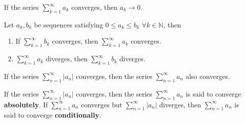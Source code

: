 \documentclass{report}
\begin{document}
\begin{theorem}
If the series  $\sum_{k=1}^{\infty}a_k$ converges, then $a_k \rightarrow 0$.
\end{theorem}

\begin{theorem}
Let $a_k,b_k$ be sequences satisfying $0 \leq a_k \leq b_k$ $\forall k \in \mathbb{N}$, then 
\begin{enumerate}
\item If  $\sum_{k=1}^{\infty}b_k$ converges, then  $\sum_{k=1}^{\infty}a_k$ converges.
\item  $\sum_{k=1}^{\infty}a_k$ diverges, then  $\sum_{k=1}^{\infty}b_k$ diverges.
\end{enumerate}
\end{theorem}
\begin{theorem}
If the series $\sum_{n=1}^{\infty}\lvert a_n \rvert$ converges, then the series $\sum_{n=1}^{\infty}a_n$ also converges.
\end{theorem}

\begin{definition}
If the series $\sum_{n=1}^{\infty}\lvert a_n \rvert$ converges, then the series $\sum_{n=1}^{\infty}a_n$ is said to converge \textbf{absolutely}. If  $\sum_{n=1}^{\infty}a_n$ converges but $\sum_{n=1}^{\infty}\lvert a_n \rvert$ diverges, then $\sum_{n=1}^{\infty}a_n$ is said to converge \textbf{conditionally}.
\end{definition}
\end{document}
